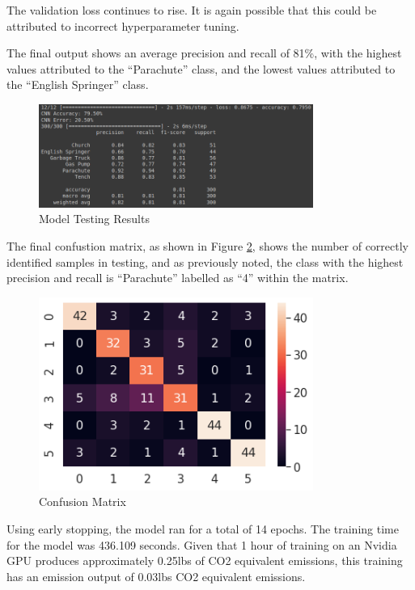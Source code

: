 The validation loss continues to rise. It is again possible that this could be
attributed to incorrect hyperparameter tuning.

The final output shows an average precision and recall of 81\%, with the highest
values attributed to the ``Parachute'' class, and the lowest values attributed
to the ``English Springer'' class.

\begin{figure}[H]
	\centering
	\includegraphics[width=0.8\textwidth]{images/q1/pa/results}
	\caption{Model Testing Results}
	\label{fig:q1paRes}
\end{figure}

The final confustion matrix, as shown in Figure \ref{fig:q1paMatrix}, shows the
number of correctly identified samples in testing, and as previously noted, the
class with the highest precision and recall is ``Parachute'' labelled as ``4''
within the matrix.

\begin{figure}[H]
	\centering
	\includegraphics[width=0.8\textwidth]{images/q1/pa/matrix}
	\caption{Confusion Matrix}
	\label{fig:q1paMatrix}
\end{figure}

Using early stopping, the model ran for a total of 14 epochs. The training time
for the model was 436.109 seconds. Given that 1 hour of training on an Nvidia
GPU produces approximately 0.25lbs of CO2 equivalent emissions, this training
has an emission output of 0.03lbs CO2 equivalent emissions.
